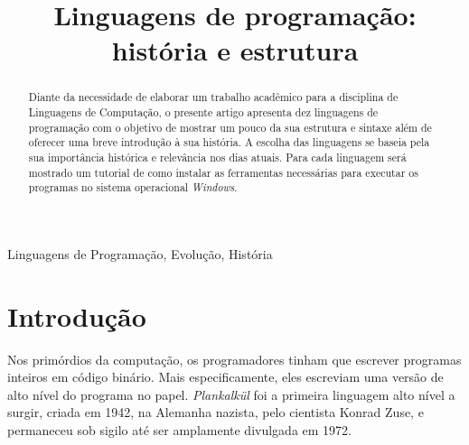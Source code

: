 \documentclass[conference]{IEEEtran}
\begin{document}
\title{Linguagens de programação: história e estrutura\\
}

\author{
}

\maketitle

\begin{abstract}
Diante da necessidade de elaborar um trabalho acadêmico para a disciplina de Linguagens de Computação, o presente artigo apresenta dez linguagens de programação com o objetivo de mostrar um pouco da sua estrutura e sintaxe além de oferecer uma breve introdução à sua história. A escolha das linguagens se baseia pela sua importância histórica e relevância nos dias atuais. Para cada linguagem será mostrado um tutorial de como instalar as ferramentas necessárias para executar os programas no sistema operacional \textit{Windows}.
\begin{comment}
Diante da necessidade de elaborar um trabalho acadêmico para a disciplina de Linguagens de Computação, o presente artigo apresenta dez linguagens de programação com o objetivo de mostrar um pouco da sua estrutura e sintaxe além de oferecer uma breve introdução à sua história. A escolha das linguagens se baseia pela sua importância histórica e relevância nos dias atuais. Para cada linguagem será mostrado um tutorial de como instalar as ferramentas necessárias para executar os programas no sistema operacional Windows.
\end{comment}
\end{abstract}

\begin{IEEEkeywords}
Linguagens de Programação, Evolução, História
\end{IEEEkeywords}

\section{Introdução}
Nos primórdios da computação, os programadores tinham que escrever programas inteiros em código binário. Mais especificamente, eles escreviam uma versão de alto nível do programa no papel. \textit{Plankalkül} foi a primeira linguagem alto nível a surgir, criada em 1942, na Alemanha nazista, pelo cientista Konrad Zuse, e permaneceu sob sigilo até ser amplamente divulgada em 1972. 
\end{document}
